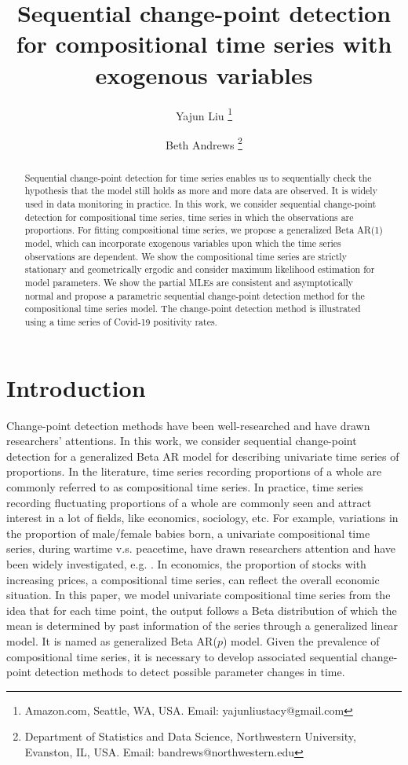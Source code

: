 \documentclass{article}
\title{Sequential change-point detection for compositional time series with exogenous variables}
\author{%
  Yajun Liu \footnote{Amazon.com, Seattle, WA, USA. Email: yajunliustacy@gmail.com}%
  \and Beth Andrews \footnote{Department of Statistics and Data Science, Northwestern University, Evanston, IL, USA. Email: bandrews@northwestern.edu}%
  }
\date{}
\theoremstyle{definition}
\begin{document}
\maketitle

\begin{abstract}
    Sequential change-point detection for time series enables us to sequentially check the hypothesis that the model still holds as more and more data are observed. It is widely used in data monitoring in practice. In this work, we consider sequential change-point detection for compositional time series, time series in which the observations are proportions. For fitting compositional time series, we propose a generalized Beta AR(1) model, which can incorporate exogenous variables upon which the time series observations are dependent.  We show the compositional time series are strictly stationary and geometrically ergodic and consider maximum likelihood estimation for model parameters. We show the partial MLEs are consistent and asymptotically normal and propose a parametric sequential change-point detection method for the compositional time series model. The change-point detection method is illustrated using a time series of Covid-19 positivity rates.
\end{abstract}


\section{Introduction}
\label{sec: introduction}
Change-point detection methods have been well-researched and have drawn researchers' attentions.
In this work, we consider sequential change-point detection for a generalized Beta AR model for describing univariate time series of proportions. In the literature, time series recording proportions of a whole are commonly referred to as compositional time series. In practice, time series recording fluctuating proportions of a whole are commonly seen and attract interest in a lot of fields, like economics, sociology, etc. For example, variations in the proportion of male/female babies born, a univariate compositional time series, during wartime v.s. peacetime, have drawn researchers attention and have been widely investigated, e.g. \cite{chao2019systematic}. In economics, the proportion of stocks with increasing prices, a compositional time series, can reflect the overall economic situation. In this paper, we model univariate compositional time series from the idea that for each time point, the output follows a Beta distribution of which the mean is determined by past information of the series through a generalized linear model. It is named as generalized Beta AR($p$) model. Given the prevalence of compositional time series, it is necessary to develop associated sequential change-point detection methods to detect possible parameter changes in time. 
\end{document}
